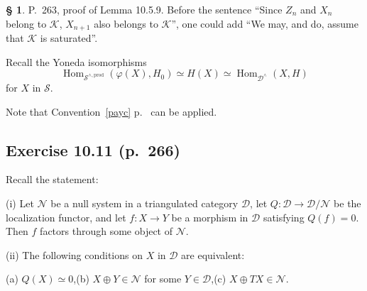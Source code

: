 \documentclass[12pt]{article}
\theoremstyle{remark}
\theoremstyle{definition}
\newtheorem{s}[thm]{\S}
\newcommand{\nn}{\noindent}
\newcommand{\cc}{\mathcal}
\newcommand{\pp}{\varphi}
\DeclareMathOperator{\Hom}{Hom}
\begin{document}

\begin{s} P.~263, proof of Lemma 10.5.9. Before the sentence ``Since $Z_n$ and $X_n$ belong to $\cc K$, $X_{n+1}$ also belongs to $\cc K$'', one could add ``We may, and do, assume that $\cc K$ is saturated''.

Recall the Yoneda isomorphisms 
$$
\Hom_{\cc S^{\wedge,\text{prod}}}(\pp(X),H_0)\simeq H(X)\simeq\Hom_{\cc D^\wedge}(X,H)
$$ 
for $X$ in $\cc S$.

Note that Convention~\ref{payc} p.~\pageref{payc} can be applied.
\end{s}


\subsection{Exercise 10.11 (p.~266)} 

Recall the statement: 

\nn(i) Let $\cc N$ be a null system in a triangulated category $\cc D$, let $Q:\cc D\to\cc D/\cc N$ be the localization functor, and let $f:X\to Y$ be a morphism in $\cc D$ satisfying $Q(f)=0$. Then $f$ factors through some object of $\cc N$. 

\nn(ii) The following conditions on $X$ in $\cc D$ are equivalent: 

\nn(a) $Q(X)\simeq0$,\quad(b) $X\oplus Y\in\cc N$ for some $Y\in\cc D$,\quad(c) $X\oplus TX\in\cc N$.
\end{document}
